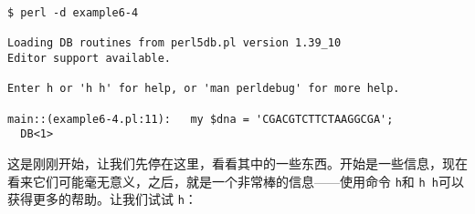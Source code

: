 
\begin{lstlisting}
$ perl -d example6-4

Loading DB routines from perl5db.pl version 1.39_10
Editor support available.

Enter h or 'h h' for help, or 'man perldebug' for more help.

main::(example6-4.pl:11):	my $dna = 'CGACGTCTTCTAAGGCGA';
  DB<1> 
\end{lstlisting}

这是刚刚开始，让我们先停在这里，看看其中的一些东西。开始是一些信息，现在看来它们可能毫无意义，之后，就是一个非常棒的信息——使用命令 \verb|h|和 \verb|h h|可以获得更多的帮助。让我们试试 \verb|h|：


